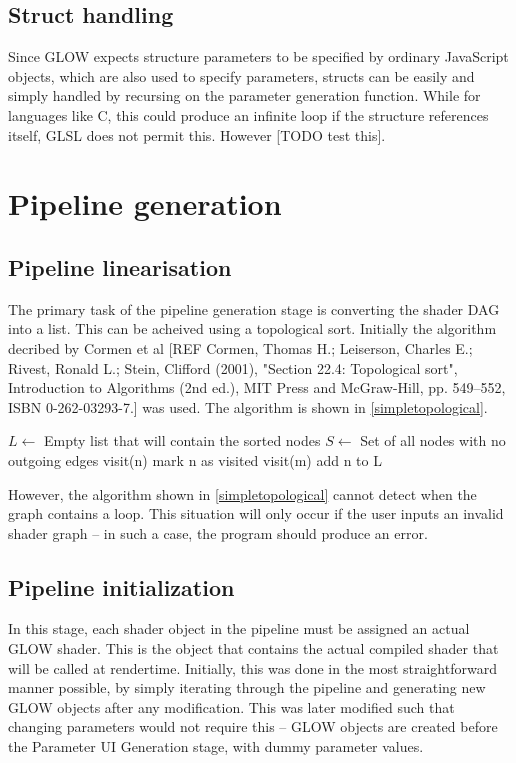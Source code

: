 \documentclass[12pt,twoside,notitlepage]{report}
\begin{document}
\subsection{Struct handling}
Since GLOW expects structure parameters to be specified by ordinary JavaScript objects, which are also used to specify parameters, structs can be easily and simply handled by recursing on the parameter generation function. While for languages like C, this could produce an infinite loop if the structure references itself, GLSL does not permit this. However [TODO test this].

\section{Pipeline generation}
\subsection*{Pipeline linearisation}
The primary task of the pipeline generation stage is converting the shader DAG into a list. This can be acheived using a topological sort. Initially the algorithm decribed by Cormen et al \cite{topsort} [REF 
Cormen, Thomas H.; Leiserson, Charles E.; Rivest, Ronald L.; Stein, Clifford (2001), "Section 22.4: Topological sort", Introduction to Algorithms (2nd ed.), MIT Press and McGraw-Hill, pp. 549–552, ISBN 0-262-03293-7.] was used. The algorithm is shown in \ref{simpletopological}.
\begin{algorithm}
\label{simpletopological}
\begin{algorithmic}
\State $L \gets $ Empty list that will contain the sorted nodes
\State $S \gets $ Set of all nodes with no outgoing edges
    visit(n)
\EndFor 
{}
        mark n as visited
            visit(m)
        \EndFor
        add n to L
    \EndIf
\EndFunction
\end{algorithmic}
\end{algorithm}
However, the algorithm shown in \ref{simpletopological} cannot detect when the graph contains a loop. This situation will only occur if the user inputs an invalid shader graph -- in such a case, the program should produce an error.

\subsection*{Pipeline initialization}
In this stage, each shader object in the pipeline must be assigned an actual GLOW shader. This is the object that contains the actual compiled shader that will be called at rendertime. Initially, this was done in the most straightforward manner possible, by simply iterating through the pipeline and generating new GLOW objects after any modification. This was later modified such that changing parameters would not require this -- GLOW objects are created before the Parameter UI Generation stage, with dummy parameter values. 
\end{document}
